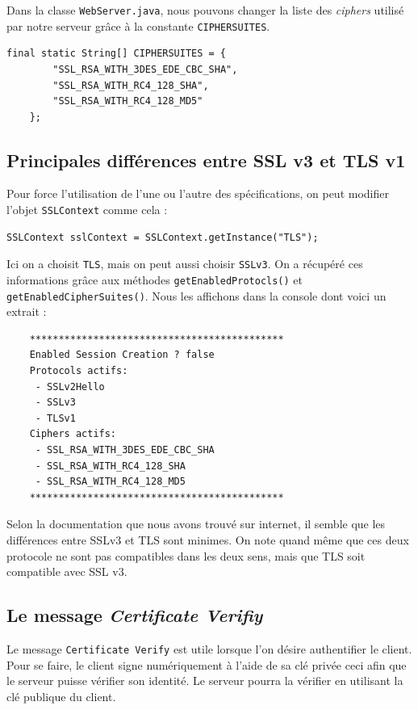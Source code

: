 \documentclass[10pt,a4paper,titlepage]{article}
\begin{document}
Dans la classe \texttt{WebServer.java}, nous pouvons changer la liste des \emph{ciphers} utilisé par notre serveur grâce à la constante \texttt{CIPHERSUITES}.

\begin{lstlisting}[frame=trBL]
	final static String[] CIPHERSUITES = {
		"SSL_RSA_WITH_3DES_EDE_CBC_SHA",  
		"SSL_RSA_WITH_RC4_128_SHA",
		"SSL_RSA_WITH_RC4_128_MD5"
	};
\end{lstlisting}

\subsection{Principales différences entre SSL v3 et TLS v1}

Pour force l'utilisation de l'une ou l'autre des spécifications, on peut modifier l'objet \texttt{SSLContext} comme cela :

\begin{lstlisting}[frame=trBL]
SSLContext sslContext = SSLContext.getInstance("TLS");
\end{lstlisting}

Ici on a choisit \texttt{TLS}, mais on peut aussi choisir \texttt{SSLv3}. On a récupéré ces informations grâce aux méthodes \texttt{getEnabledProtocls()} et \texttt{getEnabledCipherSuites()}. Nous les affichons dans la console dont voici un extrait : 

\begin{verbatim}
	********************************************
	Enabled Session Creation ? false
	Protocols actifs:
	 - SSLv2Hello
	 - SSLv3
	 - TLSv1
	Ciphers actifs:
	 - SSL_RSA_WITH_3DES_EDE_CBC_SHA
	 - SSL_RSA_WITH_RC4_128_SHA
	 - SSL_RSA_WITH_RC4_128_MD5
	********************************************
\end{verbatim}

Selon la documentation que nous avons trouvé sur internet, il semble que les différences entre SSLv3 et TLS sont minimes. On note quand même que ces deux protocole ne sont pas compatibles dans les deux sens, mais que TLS soit compatible avec SSL v3.

\subsection{Le message \emph{Certificate Verifiy}}

Le message \texttt{Certificate Verify} est utile lorsque l'on désire authentifier le client. Pour se faire, le client signe numériquement à l'aide de sa clé privée ceci afin que le serveur puisse vérifier son identité. Le serveur pourra la vérifier en utilisant la clé publique du client.
\end{document}
